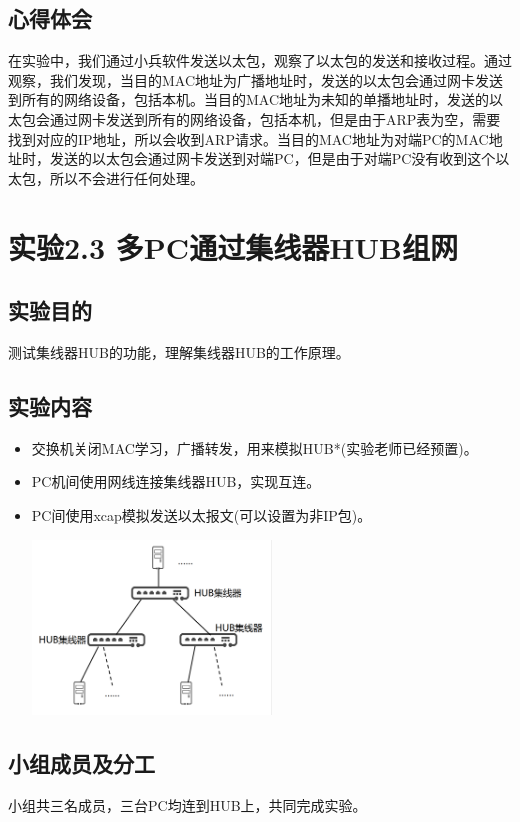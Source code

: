 \documentclass{article}
\begin{document}
\subsection{心得体会}
在实验中，我们通过小兵软件发送以太包，观察了以太包的发送和接收过程。通过观察，我们发现，当目的MAC地址为广播地址时，发送的以太包会通过网卡发送到所有的网络设备，包括本机。当目的MAC地址为未知的单播地址时，发送的以太包会通过网卡发送到所有的网络设备，包括本机，但是由于ARP表为空，需要找到对应的IP地址，所以会收到ARP请求。当目的MAC地址为对端PC的MAC地址时，发送的以太包会通过网卡发送到对端PC，但是由于对端PC没有收到这个以太包，所以不会进行任何处理。


\newpage\section{实验2.3 多PC通过集线器HUB组网}
\subsection{实验目的}
测试集线器HUB的功能，理解集线器HUB的工作原理。
\subsection{实验内容}
\begin{itemize}
    \item 交换机关闭MAC学习，广播转发，用来模拟HUB*(实验老师已经预置)。
    \item PC机间使用网线连接集线器HUB，实现互连。
    \item PC间使用xcap模拟发送以太报文(可以设置为非IP包)。
    
    \vspace{10pt}
    \centerline{\includegraphics[width=0.5\textwidth]{2_2_images/9.png}}
    \vspace{10pt}
\end{itemize}

\subsection{小组成员及分工}
小组共三名成员，三台PC均连到HUB上，共同完成实验。
\end{document}

